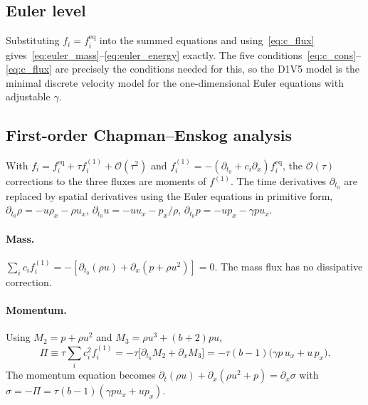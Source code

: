 \documentclass[11pt]{article}
\theoremstyle{remark}
\newcommand{\feq}{f^{\mathrm{eq}}}
\newcommand{\ord}{\mathcal{O}}
\begin{document}
\subsection{Euler level}
Substituting $f_i=\feq_i$ into the summed equations and using~\eqref{eq:c_flux}
gives~\eqref{eq:euler_mass}--\eqref{eq:euler_energy} exactly.  The five
conditions~\eqref{eq:c_cons}--\eqref{eq:c_flux} are precisely the conditions
needed for this, so the D1V5 model is the minimal discrete velocity model for the
one-dimensional Euler equations with adjustable $\gamma$.

\subsection{First-order Chapman--Enskog analysis}
\label{sec:ce_first}
With $f_i = \feq_i + \tau f_i^{(1)} + \ord(\tau^2)$ and
$f^{(1)}_i = -(\partial_{t_0} + c_i\partial_x)\feq_i$, the $\ord(\tau)$ corrections
to the three fluxes are moments of $f^{(1)}$.  The time derivatives
$\partial_{t_0}$ are replaced by spatial derivatives using the Euler equations in
primitive form,
$\partial_{t_0}\rho = -u\rho_x - \rho u_x$,
$\partial_{t_0}u = -uu_x - p_x/\rho$,
$\partial_{t_0}p = -up_x - \gamma p u_x$.

\paragraph{Mass.}  $\sum_i c_i f_i^{(1)} = -[\partial_{t_0}(\rho u) + \partial_x(p+\rho u^2)] = 0$.
The mass flux has no dissipative correction.

\paragraph{Momentum.}  Using $M_2 = p+\rho u^2$ and $M_3 = \rho u^3 + (b+2)pu$,
\begin{equation}
  \Pi \equiv \tau\sum_i c_i^2 f_i^{(1)} = -\tau\bigl[\partial_{t_0}M_2 + \partial_x M_3\bigr]
  = -\tau(b-1)\bigl(\gamma p\,u_x + u\,p_x\bigr).
  \label{eq:Pi}
\end{equation}
The momentum equation becomes
$\partial_t(\rho u) + \partial_x(\rho u^2 + p) = \partial_x\sigma$ with
$\sigma = -\Pi = \tau(b-1)(\gamma p u_x + u p_x)$.
\end{document}
